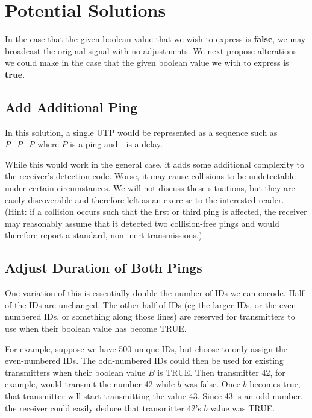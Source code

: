\documentclass[12pt]{article}
\begin{document}
\section{Potential Solutions}

In the case that the given boolean value that we wish to express is
{\bf false}, we may broadcast the original signal with no adjustments.
We next propose alterations we could make in the case that the given boolean
value we with to express is {\bf true}.

\subsection{Add Additional Ping}

In this solution, a single UTP would be represented as a sequence such as
{\em P\_P\_P} where $P$ is a ping and $\_$ is a delay.

While this would work in the general case, it adds some additional complexity
to the receiver's detection code.
Worse, it may cause collisions to be undetectable under certain circumstances.
We will not discuss these situations, but they are easily discoverable and
therefore left as an exercise to the interested reader.
(Hint: if a collision occurs such that the first or third ping is affected,
the receiver may reasonably assume that it detected two collision-free pings
and would therefore report a standard, non-inert transmissions.)

\subsection{Adjust Duration of Both Pings} \label{adj-both-pings}

One variation of this is essentially double the number of IDs we can encode.
Half of the IDs are unchanged.
The other half of IDs (eg the larger IDs, or the even-numbered IDs, or
something along those lines) are reserved for transmitters to use when their
boolean value has become TRUE.

For example, suppose we have 500 unique IDs, but choose to only assign the
even-numbered IDs.
The odd-numbered IDs could then be used for existing transmitters when their
boolean value $B$ is TRUE.
Then transmitter 42, for example, would transmit the number 42 while $b$ was
false.
Once $b$ becomes true, that transmitter will start transmitting the value 43.
Since 43 is an odd number, the receiver could easily deduce that transmitter
42's $b$ value was TRUE.
\end{document}
